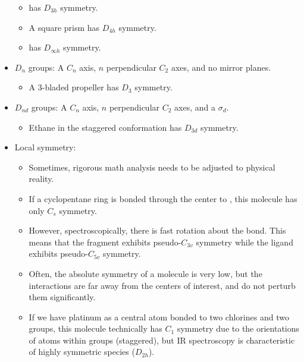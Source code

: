 \documentclass[../notes.tex]{subfiles}
\begin{document}
\begin{itemize}
\begin{itemize}
        \item {} has $D_{3h}$ symmetry.
        \item A square prism has $D_{4h}$ symmetry.
        \item {} has $D_{\infty h}$ symmetry.
    \end{itemize}
    \item $D_n$ groups: A $C_n$ axis, $n$ perpendicular $C_2$ axes, and no mirror planes.
    \begin{itemize}
        \item A 3-bladed propeller has $D_3$ symmetry.
    \end{itemize}
    \item $D_{nd}$ groups: A $C_n$ axis, $n$ perpendicular $C_2$ axes, and a $\sigma_d$.
    \begin{itemize}
        \item Ethane in the staggered conformation has $D_{3d}$ symmetry.
    \end{itemize}
    \item Local symmetry:
    \begin{itemize}
        \item Sometimes, rigorous math analysis needs to be adjusted to physical reality.
        \item If a cyclopentane ring is bonded through the center to , this molecule has only $C_s$ symmetry.
        \item However, spectroscopically, there is fast rotation about the  bond. This means that the  fragment exhibits pseudo-$C_{3v}$ symmetry while the  ligand exhibits pseudo-$C_{5v}$ symmetry.
        \item Often, the absolute symmetry of a molecule is very low, but the interactions are far away from the centers of interest, and do not perturb them significantly.
        \item If we have platinum as a central atom bonded to two chlorines and two  groups, this molecule technically has $C_1$ symmetry due to the orientations of atoms within  groups (staggered), but IR spectroscopy is characteristic of highly symmetric species ($D_{2h}$).
    \end{itemize}
\end{itemize}
\end{document}

